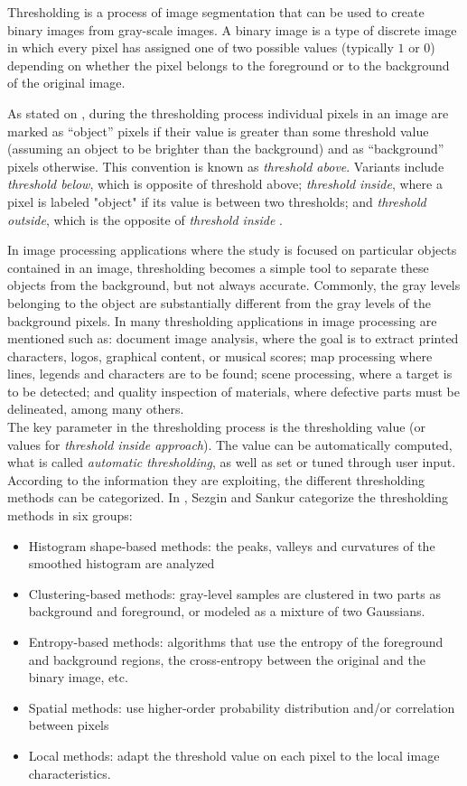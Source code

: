 Thresholding is a process of image segmentation that can be used to create
binary images from gray-scale images. A binary image is a type of discrete image in
 which every pixel has assigned one of two possible values (typically 
$1$ or $0$) depending on whether the pixel belongs
to the foreground or to the background of the original image.

As stated on \cite{web:thresholding}, during the thresholding process individual 
pixels in an image are marked as ``object'' pixels if 
their value is greater than some threshold value (assuming an object to be brighter than the 
background) and as ``background'' pixels otherwise. This convention is known as \emph{threshold above}. 
Variants include \emph{threshold below}, which is opposite of threshold above; \emph{threshold inside}, where a 
pixel is labeled "object" if its value is between two thresholds; and \emph{threshold outside}, which is 
the opposite of \emph{threshold inside} \cite{shapiro}.

In image processing applications where the study is focused on particular objects contained
in an image, thresholding becomes a simple tool to separate these objects from
the background, but not always accurate. Commonly, the gray levels belonging to the object are substantially
different from the gray levels of the background pixels. In \cite[p.146]{thres} many thresholding
applications in image processing are mentioned such as: document image analysis, where the goal
is to extract printed characters, logos, graphical content, or musical scores; map processing
where lines, legends and characters are to be found; scene processing, where a target is to
be detected; and quality inspection of materials, where defective parts must be delineated,
among many others. \\

The key parameter in the thresholding process is the thresholding value (or values for
\emph{threshold inside approach}). The value can be automatically computed, what is called
\emph{automatic thresholding}, as well as set or tuned through user input.\\
According to the information they are exploiting, the different thresholding methods can be 
categorized. In \cite[p.147]{thres}, Sezgin and Sankur categorize the thresholding methods in
six groups:
\begin{itemize}
\item Histogram shape-based methods: the peaks, valleys and curvatures of the smoothed
histogram are analyzed
\item Clustering-based methods: gray-level samples are clustered in two parts as
background and foreground, or modeled as a mixture of two Gaussians.
\item Entropy-based methods: algorithms that use the entropy of the foreground 
and background regions, the cross-entropy between the original and the binary image, 
etc.
\item Spatial methods: use higher-order probability distribution and/or 
correlation between pixels
\item Local methods: adapt the threshold value on each pixel
to the local image characteristics.
\end{itemize}

